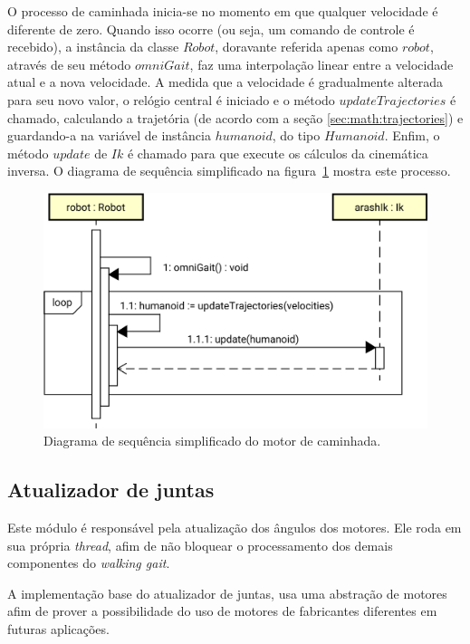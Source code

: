 O processo de caminhada inicia-se no momento em que qualquer velocidade é diferente de zero. Quando isso ocorre (ou seja, um comando de controle é recebido), a instância da classe $Robot$, doravante referida apenas como $robot$, através de seu método $omniGait$, faz uma interpolação linear entre a velocidade atual e a nova velocidade. A medida que a velocidade é gradualmente alterada para seu novo valor, o relógio central é iniciado e o método $updateTrajectories$ é chamado, calculando a trajetória (de acordo com a seção \ref{sec:math:trajectories}) e guardando-a na variável de instância $humanoid$, do tipo $Humanoid$. Enfim, o método $update$ de $Ik$ é chamado para que execute os cálculos da cinemática inversa. O diagrama de sequência simplificado na figura~\ref{fig:architecture:walkinggait:walkengine:sequence} mostra este processo.

\begin{figure}[htb]
	\centering
	\includegraphics[scale=0.5]{imagens/svg/walkinggait-walkingengine-sequence}
	\caption{Diagrama de sequência simplificado do motor de caminhada.}
	\label{fig:architecture:walkinggait:walkengine:sequence}
\end{figure}

\subsection{Atualizador de juntas}
\label{subsec:architecture:walkinggait:jointsupdater}

Este módulo é responsável pela atualização dos ângulos dos motores. Ele roda em sua própria \textit{thread}, afim de não bloquear o processamento dos demais componentes do \textit{walking gait}.

A implementação base do atualizador de juntas, usa uma abstração de motores afim de prover a possibilidade do uso de motores de fabricantes diferentes em futuras aplicações.

